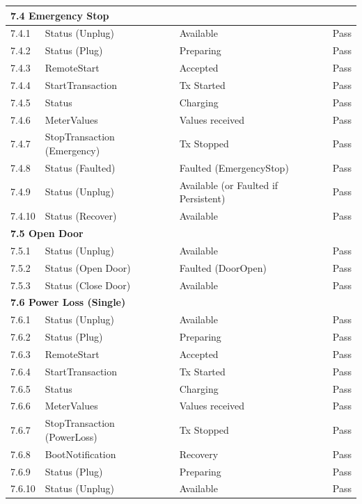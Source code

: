 \documentclass[a4paper,11pt]{report}
\begin{document}
\begin{footnotesize}
\begin{footnotesize}
\begin{longtable}{|p{1.0cm}|p{4.5cm}|p{6.5cm}|c|}
\multicolumn{4}{|l|}{\textbf{7.4 Emergency Stop}} \\
\hline
7.4.1 & Status (Unplug) & Available & Pass \\
\hline
7.4.2 & Status (Plug) & Preparing & Pass \\
\hline
7.4.3 & RemoteStart & Accepted & Pass \\
\hline
7.4.4 & StartTransaction & Tx Started & Pass \\
\hline
7.4.5 & Status & Charging & Pass \\
\hline
7.4.6 & MeterValues & Values received & Pass \\
\hline
7.4.7 & StopTransaction (Emergency) & Tx Stopped & Pass \\
\hline
7.4.8 & Status (Faulted) & Faulted (EmergencyStop) & Pass \\
\hline
7.4.9 & Status (Unplug) & Available (or Faulted if Persistent) & Pass \\
\hline
7.4.10 & Status (Recover) & Available & Pass \\
\hline

\multicolumn{4}{|l|}{\textbf{7.5 Open Door}} \\
\hline
7.5.1 & Status (Unplug) & Available & Pass \\
\hline
7.5.2 & Status (Open Door) & Faulted (DoorOpen) & Pass \\
\hline
7.5.3 & Status (Close Door) & Available & Pass \\
\hline

\multicolumn{4}{|l|}{\textbf{7.6 Power Loss (Single)}} \\
\hline
7.6.1 & Status (Unplug) & Available & Pass \\
\hline
7.6.2 & Status (Plug) & Preparing & Pass \\
\hline
7.6.3 & RemoteStart & Accepted & Pass \\
\hline
7.6.4 & StartTransaction & Tx Started & Pass \\
\hline
7.6.5 & Status & Charging & Pass \\
\hline
7.6.6 & MeterValues & Values received & Pass \\
\hline
7.6.7 & StopTransaction (PowerLoss) & Tx Stopped & Pass \\
\hline
7.6.8 & BootNotification & Recovery & Pass \\
\hline
7.6.9 & Status (Plug) & Preparing & Pass \\
\hline
7.6.10 & Status (Unplug) & Available & Pass \\
\hline


\end{longtable}
\end{footnotesize}
\end{footnotesize}
\end{document}
